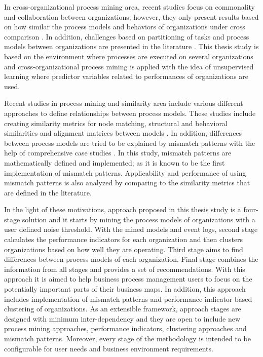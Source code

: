 In cross-organizational process mining area, recent studies focus on commonality and collaboration between organizations; however, they only present results based on how similar the process models and behaviors of organizations under cross comparison \cite{buijs2012towards}. In addition, challenges based on partitioning of tasks and process models between organizations are presented in the literature \cite{van2011intra}. This thesis study is based on the environment where processes are executed on several organizations and cross-organizational process mining is applied with the idea of unsupervised learning where predictor variables related to performances of organizations are used.

Recent studies in process mining and similarity area  include various different approaches to define relationships between process models. These studies include creating similarity metrics for node matching, structural and behavioral similarities \cite{dijkman2011similarity} and alignment matrices between models \cite{buijs2014comparing}. In addition, differences between process models are tried to be explained by mismatch patterns with the help of comprehensive case studies \cite{dijkman2007mismatch}. In this study, mismatch patterns are mathematically defined and implemented; as it is known to be the first implementation of mismatch patterns. Applicability and performance of using mismatch patterns is also analyzed by comparing to the similarity metrics that are defined in the literature. 

In the light of these motivations, approach proposed in this thesis study is a four-stage solution and it starts by mining the process models of organizations with a user defined noise threshold. With the mined models and event logs, second stage calculates the performance indicators for each organization and then clusters organizations based on how well they are operating. Third stage aims to find differences between process models of each organization. Final stage combines the information from all stages and provides a set of recommendations. With this approach it is aimed to help business process management users to focus on the potentially important parts of their business maps. In addition, this approach includes implementation of mismatch patterns and performance indicator based clustering of organizations. As an extensible framework, approach stages are designed with minimum inter-dependency and they are open to include new process mining approaches, performance indicators, clustering approaches and mismatch patterns. Moreover, every stage of the methodology is intended to be configurable for user needs and business environment requirements.


